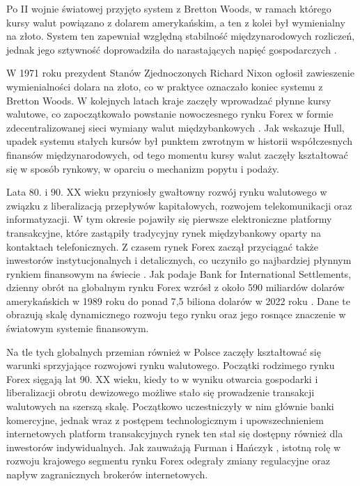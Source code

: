 Po II wojnie światowej przyjęto system z Bretton Woods, w ramach którego kursy walut powiązano z dolarem amerykańskim, a ten z kolei był wymienialny na złoto. 
System ten zapewniał względną stabilność międzynarodowych rozliczeń, jednak jego sztywność doprowadziła do narastających napięć gospodarczych \parencite{mishkin2018}. 

W 1971 roku prezydent Stanów Zjednoczonych Richard Nixon ogłosił zawieszenie wymienialności dolara na złoto, co w praktyce oznaczało koniec systemu z Bretton Woods. 
W kolejnych latach kraje zaczęły wprowadzać płynne kursy walutowe, co zapoczątkowało powstanie nowoczesnego rynku Forex w formie zdecentralizowanej sieci wymiany walut międzybankowych \parencite{hull2018}. 
Jak wskazuje Hull, upadek systemu stałych kursów był punktem zwrotnym w historii współczesnych finansów międzynarodowych, od tego momentu kursy walut zaczęły kształtować się w sposób rynkowy,
w oparciu o mechanizm popytu i podaży. 

Lata 80. i 90. XX wieku przyniosły gwałtowny rozwój rynku walutowego w związku z liberalizacją przepływów kapitałowych, rozwojem telekomunikacji oraz informatyzacji. 
W tym okresie pojawiły się pierwsze elektroniczne platformy transakcyjne, które zastąpiły tradycyjny rynek międzybankowy oparty na kontaktach telefonicznych. 
Z czasem rynek Forex zaczął przyciągać także inwestorów instytucjonalnych i detalicznych, co uczyniło go najbardziej płynnym rynkiem finansowym na świecie \parencite{zukowski2014}. 
Jak podaje Bank for International Settlements, dzienny obrót na globalnym rynku Forex wzrósł z około 590 miliardów dolarów amerykańskich w 1989 roku do ponad 7{,}5 biliona dolarów w 2022 roku \parencite{bis2022}.
Dane te obrazują skalę dynamicznego rozwoju tego rynku oraz jego rosnące znaczenie w światowym systemie finansowym. 

Na tle tych globalnych przemian również w Polsce zaczęły kształtować się warunki sprzyjające rozwojowi rynku walutowego. 
Początki rodzimego rynku Forex sięgają lat 90. XX wieku, kiedy to w wyniku otwarcia gospodarki i liberalizacji obrotu dewizowego możliwe stało się prowadzenie transakcji walutowych na szerszą skalę.
Początkowo uczestniczyły w nim głównie banki komercyjne, jednak wraz z postępem technologicznym i upowszechnieniem internetowych platform transakcyjnych rynek ten stał się dostępny również dla inwestorów indywidualnych.
Jak zauważają Furman i Hańczyk \parencite{furman2016}, istotną rolę w rozwoju krajowego segmentu rynku Forex odegrały zmiany regulacyjne oraz napływ zagranicznych brokerów internetowych.

